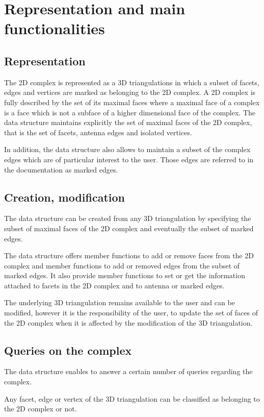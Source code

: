 \section{Representation  and main functionalities\label{section_C2inT3_Functionalities}}

\subsection{Representation}
The 2D complex is represented as a 3D triangulations in which
a subset of facets, edges and vertices are marked as belonging to the 
2D complex.  
A 2D complex is fully described by the set of its maximal faces
where a maximal face of a complex is a face which is not
a subface of a higher dimensional face of the complex.
The data structure maintains explicitly the set of maximal faces 
of the 2D complex, that is 
the set of facets, antenna edges and isolated vertices.

In addition, the data structure also allows to maintain a subset
of the complex edges which are of particular interest to the user.
Those edges are referred to in the documentation as marked
edges.

\subsection{Creation, modification}
The data structure can be created from any 3D triangulation
by specifying the subset of maximal faces of the 2D complex
and eventually the subset of marked edges.

The data structure offers member functions to add or remove faces from the
2D complex and member functions  to add or removed edges
from the subset of marked edges. It also provide member functions
to set or get the information attached to facets in the 2D complex
and  to antenna or  marked edges.

The underlying 3D triangulation remains  available to the user
and can be modified,  however it is the responsibility
of the user, to update the set of faces of the 2D complex
when  it is affected by  the modification of the 3D triangulation.


\subsection{Queries on the complex}
The data structure enables to answer  a certain number of queries
regarding the complex.

Any facet, edge or vertex  of the  3D triangulation 
can be classified as belonging to the 2D complex or not.

